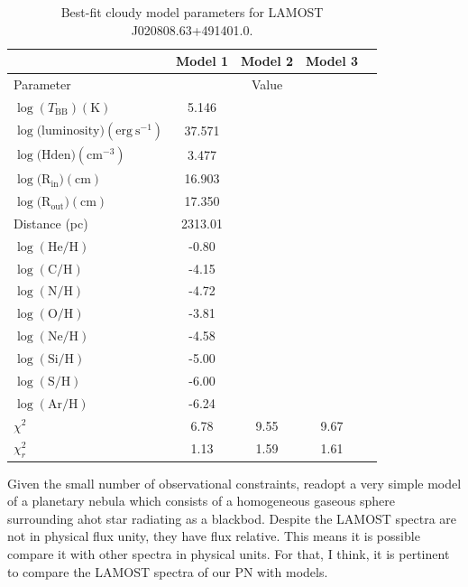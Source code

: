 \documentclass[fleqn,usenatbib]{mnras}
\begin{document}
{%
\begin{table}
	\centering
	\caption{Best-fit {\sc cloudy} model parameters for LAMOST J020808.63+491401.0.}
	\label{tab:example_table}
	\begin{tabular}{lcccc} %
                \hline
                & Model 1 &  Model 2 &  Model 3\\  
		\hline
		Parameter & & Value \\
                \hline
		$\log(T_{\mathrm{BB}}) (\mathrm{K})$  & 5.146 \\
		$\log(\mathrm{luminosity) (erg~s^{-1})}$ & 37.571 \\
		  $\log(\mathrm{Hden) (cm^{-3})} $ & 3.477 \\
                  $\log(\mathrm{R_{in}) (cm)}$ & 16.903 \\
                $\log(\mathrm{R_{out}) (cm)}$ & 17.350 \\
                 Distance (pc) & 2313.01 \\
                  $\log(\mathrm{He/H})$ & -0.80 \\
                $\log(\mathrm{C/H})$ & -4.15 \\
                $\log(\mathrm{N/H})$ & -4.72 \\
                $\log(\mathrm{O/H})$ & -3.81 \\
                $\log(\mathrm{Ne/H})$ & -4.58 \\
                $\log(\mathrm{Si/H})$ & -5.00 \\
                $\log(\mathrm{S/H})$ & -6.00 \\
                $\log(\mathrm{Ar/H})$ & -6.24 \\
                 \hline
                 $\chi^2$ & 6.78 &9.55& 9.67& \\
                 $\chi^2_r$ & 1.13 & 1.59&1.61& \\
                 
                \hline
	\end{tabular}
\end{table}

Given the small number of observational constraints, readopt a very simple model of a planetary nebula which
consists of a homogeneous gaseous sphere surrounding ahot star radiating as a blackbod.
Despite the LAMOST spectra are not in physical flux unity, they have flux relative. This means it
is possible compare it with other spectra in physical units. For that, I think, it is pertinent to
compare the LAMOST spectra of our PN with models.

}
\end{document}
